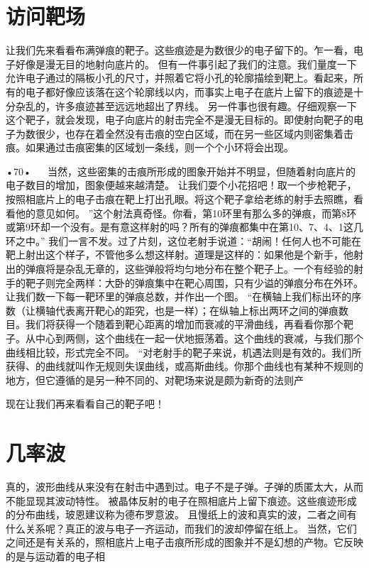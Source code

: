 \section{访问靶场}

让我们先来看看布满弹痕的靶子。这些痕迹是为数很少的电子留下的。乍一看，电子好像是漫无目的地射向底片的。
但有一件事引起了我们的注意。我们量度一下允许电子通过的隔板小孔的尺寸，并照着它将小孔的轮廓描绘到靶上。看起来，所有的电子都好像应该落在这个轮廓线以内，而事实上电子在底片上留下的痕迹是十分杂乱的，许多痕迹甚至远远地超出了界线。
另一件事也很有趣。仔细观察一下这个靶子，就会发现，电子向底片的射击完全不是漫无目标的。即使射向靶子的电子为数很少，也存在着全然没有击痕的空白区域，而在另一些区域内则密集着击痕。如果通过击痕密集的区域划一条线，则一个个小环将会出现。

•70•
  
当然，这些密集的击痕所形成的图象开始并不明显，但随着射向底片的电子数目的增加，图象便越来越清楚。
让我们耍个小花招吧！取一个步枪靶子，按照相底片上的电子击痕在靶上打出孔眼。将这个靶子拿给老练的射手去照瞧，看看他的意见如何。
”这个射法真奇怪。你看，第10环里有那么多的弹痕，而第8环或第9环却一个没有。是有意这样射的吗？所有的弹痕都集中在第10、7、4、1这几环之中。”
我们一言不发。过了片刻，这位老射手说道：“胡闹！任何人也不可能在靶上射出这个样子，不管他多么想这样射。道理是这样的：如果他是个新手，他射出的弹痕将是杂乱无章的，这些弹般将均匀地分布在整个靶子上。一个有经验的射手的靶子则完全两样：大卧的弹痕集中在靶心周围，只有少谥的弹痕分布在外环。让我们数一下每一靶环里的弹痕总数，并作出一个图。
“在横轴上我们标出环的序数（让横轴代表离开靶心的距究，也是一样）；在纵轴上标出两环之间的弹痕数目。我们将获得一个随着到靶心距离的增加而衰减的平滑曲线，再看看你那个靶子。从中心到两侧，这个曲线在一起一伏地振荡着。这个曲线的衰减，与我们那个曲线相比较，形式完全不同。
“对老射手的靶子来说，机遇法则是有效的。我们所获得、的曲线就叫作无规则失误曲线，或高斯曲线。你那个曲线也有某种不规则的地方，但它遵循的是另一种不同的、对靶场来说是颇为新奇的法则产

现在让我们再来看看自己的靶子吧！

\section{几率波}

真的，波形曲线从来没有在射击中遇到过。电子不是子弹。子弹的质匿太大，从而不能显现其波动特性。
被晶体反射的电子在照相底片上留下痕迹。这些痕迹形成的分布曲线，玻恩建议称为德布罗意波。
且慢纸上的波和真实的波，二者之间有什么关系呢？真正的波与电子一齐运动，而我们的波却停留在纸上。
当然，它们之间还是有关系的，照相底片上电子击痕所形成的图象并不是幻想的产物。它反映的是与运动着的电子相

